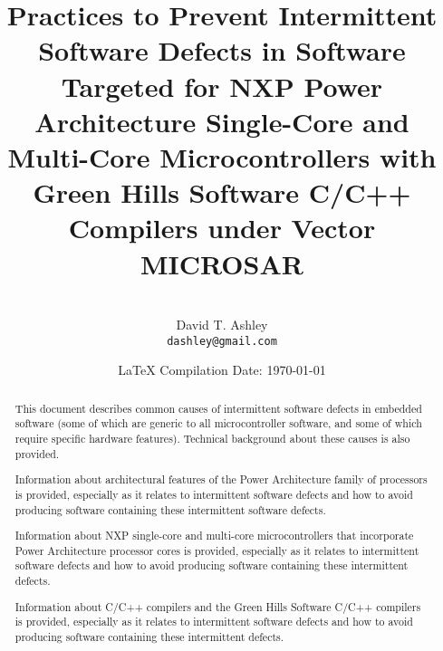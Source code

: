 \documentclass[letterpaper,10pt,titlepage]{article}
\begin{document}
\title{Practices to Prevent Intermittent Software Defects in Software Targeted for 
       NXP\textsuperscript{\textregistered}
       Power Architecture\textsuperscript{\textregistered} Single-Core and 
	   Multi-Core Microcontrollers
	   with Green Hills Software\textsuperscript{\textregistered} C/C++ Compilers
	   under Vector\textsuperscript{\textregistered}
	   MICROSAR\textsuperscript{\textregistered}}
\author{\vspace{3cm}\\David T. Ashley\\\texttt{dashley@gmail.com}\\\vspace{3cm}}
\date{\LaTeX{} Compilation Date: \today{}}
\maketitle
%
%
\begin{abstract}
This document describes common causes of intermittent software defects
in embedded software (some of which are generic to all microcontroller
software, and some of which require specific hardware features).  Technical
background about these causes is also provided.

Information about architectural features of the 
Power Architecture\textsuperscript{\textregistered} family of processors is
provided, especially as it relates to intermittent software defects and how
to avoid producing software containing these intermittent software defects.

Information about NXP\textsuperscript{\textregistered} single-core and
multi-core microcontrollers that incorporate
Power Architecture\textsuperscript{\textregistered} processor cores is provided,
especially as it relates to intermittent software defects and how to avoid
producing software containing these intermittent defects.

Information about C/C++ compilers and the 
Green Hills Software\textsuperscript{\textregistered} C/C++ compilers
is provided,
especially as it relates to intermittent software defects and how to avoid
producing software containing these intermittent defects.
\end{abstract}

\tableofcontents{}
\clearpage{}
\listoffigures{}
\listoftables{}
\clearpage{}
\end{document}
